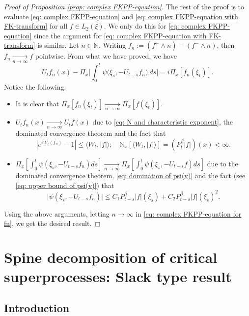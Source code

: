 \documentclass[UTF8]{pkuthss}
\theoremstyle{plain}
\theoremstyle{definition}
\numberwithin{equation}{section}
\begin{document}
\begin{proof}[Proof of Proposition \ref{prop: complex FKPP-equation}]
    The rest of the proof is to evaluate \eqref{eq: complex FKPP-equation} and \eqref{eq: complex FKPP-equation with FK-transform} for all $f\in L_2(\xi)$. We only do this for \eqref{eq: complex FKPP-equation} since the argument for \eqref{eq: complex FKPP-equation with FK-transform} is similar.
    Let $n \in \mathbb N$.
    Writing $f_n := (f^+ \wedge n) - (f^- \wedge n)$, then $f_n \xrightarrow[n\to \infty]{} f$ pointwise.
    From what we have proved, we have
\begin{equation}
\label{eq: complex FKPP-equation for fn}
    U_tf_n(x) - \Pi_{x} \Big[\int_0^t \psi\big(\xi_s, - U_{t-s}f_n\big) ~ds\Big]
    = i \Pi_{x} [f_n(\xi_t)].
\end{equation}
    Notice the following:
\begin{itemize}
\item
    It is clear that $\Pi_{x}[f_n(\xi_t)] \xrightarrow[n\to \infty]{} \Pi_{x}[f(\xi_t)]$.
\item
    $U_tf_n(x) \xrightarrow[n\to \infty]{} U_tf(x)$ due to \eqref{eq: N and characteristic exponent}, the dominated convergence theorem and the fact that
\[
    |e^{i W_t(f_n)} - 1| \leq \langle W_t, |f|\rangle;
    \quad \mathbb N_x[\langle W_t, |f|\rangle] = (P_t^{\beta} |f|)(x) < \infty.
\]
\item
    $\Pi_{x} [\int_0^t \psi(\xi_s,- U_{t-s}f_n)ds] \xrightarrow[n\to \infty]{} \Pi_{x} [\int_0^t \psi(\xi_s,- U_{t-s}f)ds]$ due to the dominated convergence theorem, \eqref{eq: domination of psi(v)} and the fact (see \eqref{eq: upper bound of psi(v)}) that
\begin{equation}
    \big|\psi(\xi_s,- U_{t-s}f_n)\big|
    \leq C_1 P_{t-s}^{\beta}|f|(\xi_s)+C_2 P_{t-s}^{\beta}|f|(\xi_s)^2.
\end{equation}
\end{itemize}
    Using the above arguments, letting $n \to \infty$ in \eqref{eq: complex FKPP-equation for fn}, we get the desired result.
\end{proof}

\chapter{Spine decomposition of critical superprocesses: Slack type result}
\section{Introduction}
\end{document}
